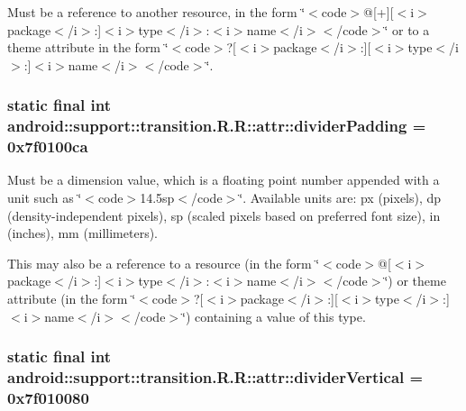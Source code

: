 Must be a reference to another resource, in the form \char`\"{}$<$code$>$@\mbox{[}+\mbox{]}\mbox{[}$<$i$>$package$<$/i$>$:\mbox{]}$<$i$>$type$<$/i$>$:$<$i$>$name$<$/i$>$$<$/code$>$\char`\"{} or to a theme attribute in the form \char`\"{}$<$code$>$?\mbox{[}$<$i$>$package$<$/i$>$:\mbox{]}\mbox{[}$<$i$>$type$<$/i$>$:\mbox{]}$<$i$>$name$<$/i$>$$<$/code$>$\char`\"{}. \hypertarget{classandroid_1_1support_1_1transition_1_1_r_1_1attr_390f95a7874f4d36692fd2ea9dc621b1}{
\subsubsection[{dividerPadding}]{\setlength{\rightskip}{0pt plus 5cm}static final int android::support::transition.R.R::attr::dividerPadding = 0x7f0100ca}}
\label{classandroid_1_1support_1_1transition_1_1_r_1_1attr_390f95a7874f4d36692fd2ea9dc621b1}


Must be a dimension value, which is a floating point number appended with a unit such as \char`\"{}$<$code$>$14.5sp$<$/code$>$\char`\"{}. Available units are: px (pixels), dp (density-independent pixels), sp (scaled pixels based on preferred font size), in (inches), mm (millimeters). 

This may also be a reference to a resource (in the form \char`\"{}$<$code$>$@\mbox{[}$<$i$>$package$<$/i$>$:\mbox{]}$<$i$>$type$<$/i$>$:$<$i$>$name$<$/i$>$$<$/code$>$\char`\"{}) or theme attribute (in the form \char`\"{}$<$code$>$?\mbox{[}$<$i$>$package$<$/i$>$:\mbox{]}\mbox{[}$<$i$>$type$<$/i$>$:\mbox{]}$<$i$>$name$<$/i$>$$<$/code$>$\char`\"{}) containing a value of this type. \hypertarget{classandroid_1_1support_1_1transition_1_1_r_1_1attr_f90a337dd24e416f7d534e828e824ca6}{
\subsubsection[{dividerVertical}]{\setlength{\rightskip}{0pt plus 5cm}static final int android::support::transition.R.R::attr::dividerVertical = 0x7f010080}}
\label{classandroid_1_1support_1_1transition_1_1_r_1_1attr_f90a337dd24e416f7d534e828e824ca6}



